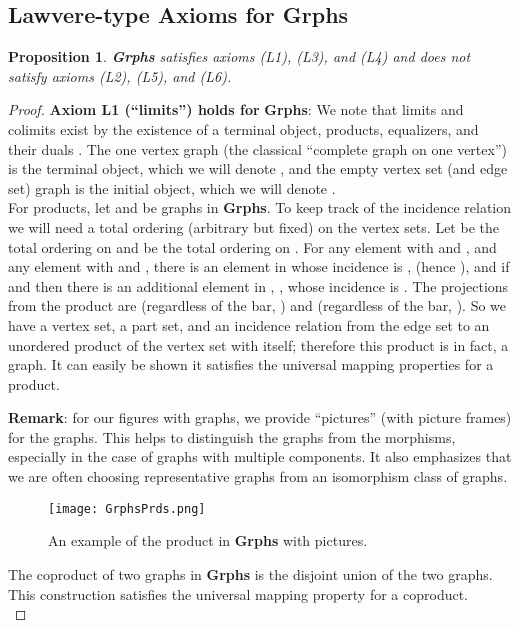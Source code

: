 \documentclass[11pt]{article}
\newtheorem{proposition}[theorem]{Proposition}
\begin{document}
\subsection{Lawvere-type Axioms for \textbf{Grphs}}
\begin{proposition}
\textbf{Grphs} satisfies axioms (L1), (L3), and (L4) and does not satisfy axioms (L2), (L5), and (L6).
\end{proposition}
\begin{proof}
\textbf{Axiom L1 (``limits'') holds for} \textbf{Grphs}: We note that limits and colimits exist by the existence of a terminal object, products, equalizers, and their duals \cite{Mac}. The one vertex graph  (the classical ``complete graph on one vertex'') is the terminal object, which we will denote , and the empty vertex set (and edge set) graph  is the initial object, which we will denote .\\
\indent For products, let  and  be graphs in \textbf{Grphs}. To keep track of the incidence relation we will need a total ordering (arbitrary but fixed) on the vertex sets. Let  be the total ordering on  and  be the total ordering on . For any element  with \textunderscore and , and any element  with \textunderscore and , there is an element  in  whose incidence is \textunderscore, (hence ), and if  and  then there is an additional element in , , whose incidence is \textunderscore. The projections from the product are  (regardless of the bar,  ) and  (regardless of the bar,  ). So we have a vertex set, a part set, and an incidence relation from the edge set to an unordered product of the vertex set with itself; therefore this product is in fact, a graph. It can easily be shown it satisfies the universal mapping properties for a product.\par
\textbf{Remark}: for our figures with graphs, we provide ``pictures'' (with picture frames) for the graphs. This helps to distinguish the graphs from the morphisms, especially in the case of graphs with multiple components. It also emphasizes that we are often choosing representative graphs from an isomorphism class of graphs.\\
\begin{figure}[h]
\centering \texttt{[image: GrphsPrds.png]}
\caption{An example of the product in \textbf{Grphs} with pictures.}
\end{figure}\par
\indent The coproduct of two graphs in \textbf{Grphs} is the disjoint union of the two graphs. This construction satisfies the universal mapping property for a coproduct.\\

\end{proof}
\end{document}
